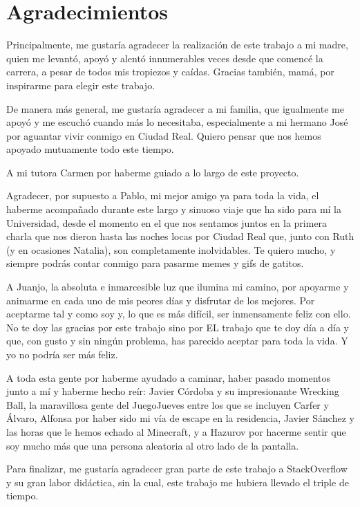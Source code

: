 \ifspanish
\else
\fi

%
%
\cleardoublepage
{} %

\chapter*{Agradecimientos} %

Principalmente, me gustaría agradecer la realización de este trabajo a mi madre, quien me levantó, apoyó y alentó innumerables veces desde que comencé la carrera, a pesar de todos mis tropiezos y caídas. Gracias también, mamá, por inspirarme para elegir este trabajo.

De manera más general, me gustaría agradecer a mi familia, que igualmente me apoyó y me escuchó cuando más lo necesitaba, especialmente a mi hermano José por aguantar vivir conmigo en Ciudad Real. Quiero pensar que nos hemos apoyado mutuamente todo este tiempo.

A mi tutora Carmen por haberme guiado a lo largo de este proyecto.

Agradecer, por supuesto a Pablo, mi mejor amigo ya para toda la vida, el haberme acompañado durante este largo y sinuoso viaje que ha sido para mí la Universidad, desde el momento en el que nos sentamos juntos en la primera charla que nos dieron hasta las noches locas por Ciudad Real que, junto con Ruth (y en ocasiones Natalia), son completamente inolvidables. Te quiero mucho, y siempre podrás contar conmigo para pasarme memes y gifs de gatitos.

A Juanjo, la absoluta e inmarcesible luz que ilumina mi camino, por apoyarme y animarme en cada uno de mis peores días y disfrutar de los mejores. Por aceptarme tal y como soy y, lo que es más difícil, ser inmensamente feliz con ello. No te doy las gracias por este trabajo sino por EL trabajo que te doy día a día y que, con gusto y sin ningún problema, has parecido aceptar para toda la vida. Y yo no podría ser más feliz.

A toda esta gente por haberme ayudado a caminar, haber pasado momentos junto a mí y haberme hecho reír: Javier Córdoba y su impresionante Wrecking Ball, la maravillosa gente del JuegoJueves entre los que se incluyen Carfer y Álvaro, Alfonsa por haber sido mi vía de escape en la residencia, Javier Sánchez y las horas que le hemos echado al Minecraft, y a Hazurov por hacerme sentir que soy mucho más que una persona aleatoria al otro lado de la pantalla.

Para finalizar, me gustaría agradecer gran parte de este trabajo a StackOverflow y su gran labor didáctica, sin la cual, este trabajo me hubiera llevado el triple de tiempo.



\makeatletter		
\begin{flushright}
	\textit{\@autor}
\end{flushright}
\makeatother